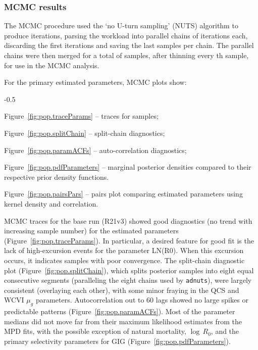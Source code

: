 \documentclass[11pt]{book}
\newcommand{\code}[1]{\texttt{#1}}
\begin{document}


\graphicspath{{C:/Users/haighr/Files/GFish/PSARC23/POP/Data/SS/POP2023/Run21/MPD.21.01.v3/}}
\clearpage

\subsubsection{MCMC results}\label{sss:MCMC}


The MCMC procedure used the `no U-turn sampling' (NUTS) algorithm \citep{Monnahan-Kristensen:2018, Monnahan-etal:2019} to produce \nSimsBase{} iterations, parsing the workload into \nChains{} parallel chains \citep{R:2015_snowfall} of \cSimsBase{} iterations each, discarding the first \cBurnBase{} iterations and saving the last \cSampBase{} samples per chain.
The parallel chains were then merged for a total of \Nmcmc{} samples, after thinning every \nThinBase{}th sample, for use in the MCMC analysis.

For the primary estimated parameters, MCMC plots show:
\begin{itemize_csas}{-0.5}{}
\item Figure~\ref{fig:pop.traceParams} -- traces for \Nmcmc{} samples;
\item Figure~\ref{fig:pop.splitChain} -- split-chain diagnostics;
\item Figure~\ref{fig:pop.paramACFs} -- auto-correlation diagnostics;
\item Figure~\ref{fig:pop.pdfParameters} -- marginal posterior densities compared to their respective prior density functions.
\item Figure~\ref{fig:pop.pairsPars} -- pairs plot comparing estimated parameters using kernel density and correlation.
\end{itemize_csas}

MCMC traces for the base run (R21v3) showed good diagnostics (no trend with increasing sample number) for the estimated parameters (Figure~\ref{fig:pop.traceParams}).
In particular, a desired feature for good fit is the lack of high-excursion events for the parameter LN(R0).
When this excursion occurs, it indicates samples with poor convergence.
The split-chain diagnostic plot (Figure~\ref{fig:pop.splitChain}), which splits posterior samples into eight equal consecutive segments (paralleling the eight chains used by \code{adnuts}), were largely consistent (overlaying each other), with some minor fraying in the QCS and WCVI $\mu_g$ parameters.
Autocorrelation out to 60 lags showed no large spikes or predictable patterns (Figure~\ref{fig:pop.paramACFs}).
Most of the parameter medians did not move far from their maximum likelihood estimates from the MPD fits, with the possible exception of natural mortality, $\log\,R_0$, and the primary selectivity parameters for GIG (Figure~\ref{fig:pop.pdfParameters}).
\end{document}
